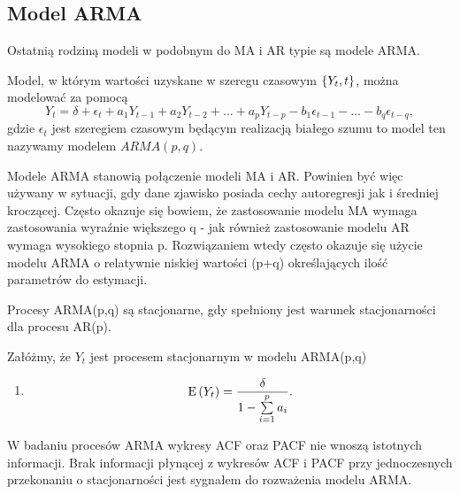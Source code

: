 \documentclass[10pt,a4paper]{book}
\begin{document}
\subsection{Model ARMA}

Ostatnią rodziną modeli w podobnym do MA i AR typie są modele ARMA.

\begin{definition}

Model, w którym wartości uzyskane w szeregu czasowym $\left\lbrace {{Y_t}, {t}} \right\rbrace$, można modelować za pomocą
$$
Y_t = \delta + \epsilon_t + a_1 Y_{t-1} + a_2 Y_{t-2} + \ldots + a_p Y_{t-p} - b_1 \epsilon_{t-1} -\ldots - b_q \epsilon_{t-q} ,
$$
gdzie $\epsilon_t $ jest szeregiem czasowym będącym realizacją białego szumu to model ten nazywamy modelem  $ARMA(p,q)$.
\end{definition}

\begin{remark}
Modele ARMA stanowią połączenie modeli MA i AR. Powinien być więc używany w sytuacji, gdy dane zjawisko posiada cechy autoregresji jak i średniej kroczącej. Często okazuje się bowiem, że zastosowanie modelu MA wymaga zastosowania wyraźnie większego q - jak również zastosowanie modelu AR wymaga wysokiego stopnia p. Rozwiązaniem wtedy często okazuje się użycie modelu ARMA o relatywnie niskiej wartości (p+q) określających ilość parametrów do estymacji.
\end{remark}

\begin{remark}
Procesy ARMA(p,q) są stacjonarne, gdy spełniony jest warunek stacjonarności dla procesu AR(p).
\end{remark}

\begin{proposition}
Załóżmy, że $Y_t$ jest procesem stacjonarnym w modelu ARMA(p,q)
\begin{enumerate}
\item 
$$
\Ex{Y_t} = \frac{\delta}{1	- \sum_{i=1}^{p} a_i}.
$$
\end{enumerate}
\end{proposition}

\begin{remark}
W badaniu procesów ARMA wykresy ACF oraz PACF nie wnoszą istotnych informacji. Brak informacji płynącej z wykresów ACF i PACF przy jednoczesnych przekonaniu o stacjonarności jest sygnałem do rozważenia modelu ARMA.
\end{remark}
\end{document}
